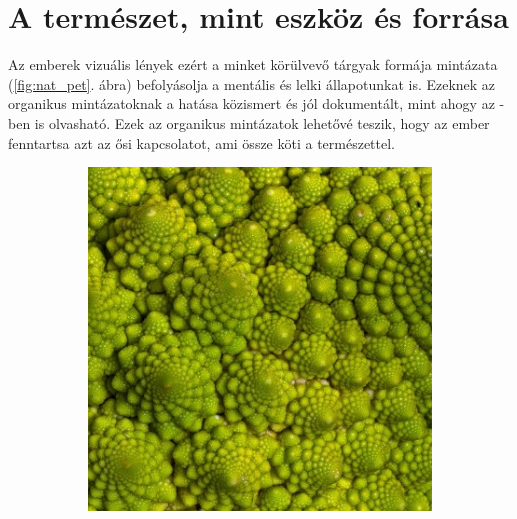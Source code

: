 \chapter{A természet, mint eszköz és forrása}

Az emberek vizuális lények ezért a minket körülvevő tárgyak formája mintázata (\ref{fig:nat_pet}. ábra) befolyásolja a mentális és lelki állapotunkat is. Ezeknek az organikus mintázatoknak a hatása közismert és jól dokumentált, mint ahogy az \cite{jo2019physiological} -ben is olvasható. Ezek az organikus mintázatok lehetővé teszik, hogy az ember fenntartsa azt az ősi kapcsolatot, ami össze köti a természettel. 

\begin{figure}[ht!]
	\centering
	\begin{subfigure}[b]{0.225\textwidth}
		\centering
		\includegraphics[width=\textwidth]{img/nat_pat_01.jpg}
		\caption{}    
	\end{subfigure}
	\hspace{10 mm}
	\begin{subfigure}[b]{0.225\textwidth}  
		\centering 

\end{subfigure}
\end{figure}
